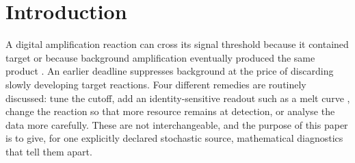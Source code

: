 \documentclass[11pt,a4paper]{article}
\theoremstyle{plain}
\theoremstyle{definition}
\theoremstyle{remark}
\begin{document}
\section{Introduction}\label{sec:intro}

A digital amplification reaction can cross its signal threshold because it contained target or because background amplification eventually produced the same product \citep{notomi2000,vogelstein1999,rolando2019,hardinge2019}. An earlier deadline suppresses background at the price of discarding slowly developing target reactions. Four different remedies are routinely discussed: tune the cutoff, add an identity-sensitive readout such as a melt curve \citep{rolando2020}, change the reaction so that more resource remains at detection, or analyse the data more carefully. These are not interchangeable, and the purpose of this paper is to give, for one explicitly declared stochastic source, mathematical diagnostics that tell them apart.
\end{document}
